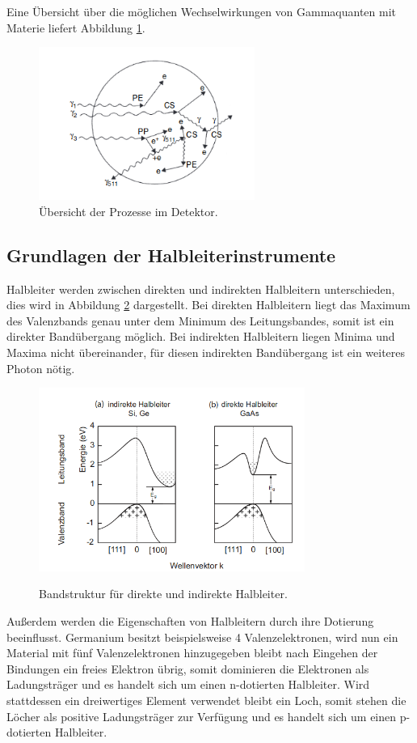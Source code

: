 Eine Übersicht über die möglichen Wechselwirkungen von Gammaquanten mit Materie liefert
Abbildung \ref{fig:Effekt}.
\begin{figure}[H]
  \centering
  \includegraphics[height=5cm]{Effekte.png}
  \caption{Übersicht der Prozesse im Detektor. \cite{Gilmore2}}
  \label{fig:Effekt}
\end{figure}


\subsection{Grundlagen der Halbleiterinstrumente}
Halbleiter werden zwischen direkten und indirekten Halbleitern unterschieden, dies wird
in Abbildung \ref{fig:Band} dargestellt. Bei direkten Halbleitern
liegt das Maximum des Valenzbands genau unter dem Minimum des Leitungsbandes, somit ist ein direkter Bandübergang möglich.
Bei indirekten Halbleitern liegen Minima und Maxima nicht übereinander, für diesen indirekten Bandübergang ist
ein weiteres Photon nötig.\\

\begin{figure}
  \centering
  \includegraphics[height=6cm]{Band.png}
  \caption{Bandstruktur für direkte und indirekte Halbleiter.}
  \label{fig:Band}
  \cite{Springer3}
\end{figure}

Außerdem werden die Eigenschaften von Halbleitern durch ihre Dotierung beeinflusst. Germanium besitzt
beispielsweise 4 Valenzelektronen, wird nun ein Material mit fünf Valenzelektronen hinzugegeben bleibt nach
Eingehen der Bindungen ein freies Elektron übrig, somit dominieren die Elektronen als Ladungsträger und es handelt
sich um einen n-dotierten Halbleiter.
Wird stattdessen ein dreiwertiges Element verwendet bleibt ein Loch, somit stehen die Löcher als
positive Ladungsträger zur Verfügung und es handelt sich um einen p-dotierten Halbleiter.\\

